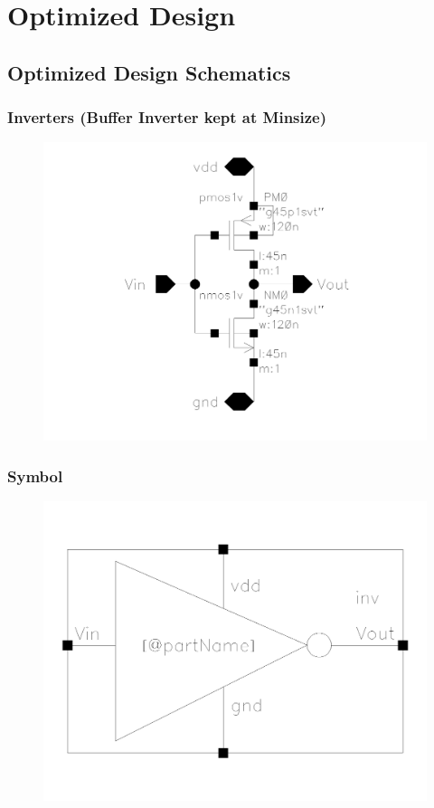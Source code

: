 \documentclass[12pt]{article}
\begin{document}
\newpage

\section{Optimized Design}
\subsection{Optimized Design Schematics}

\subsubsection*{Inverters (Buffer Inverter kept at Minsize)}

\begin{figure}[H]
    \centering
    \includegraphics[width=0.6\linewidth]{writeup//figures/inv_sch.png}
    \caption{}
\end{figure}

\subsubsection*{Symbol}

\begin{figure}[H]
    \centering
    \includegraphics[width=0.6\linewidth]{writeup//figures/inv_sym.png}
    \caption{}
\end{figure}
\end{document}
